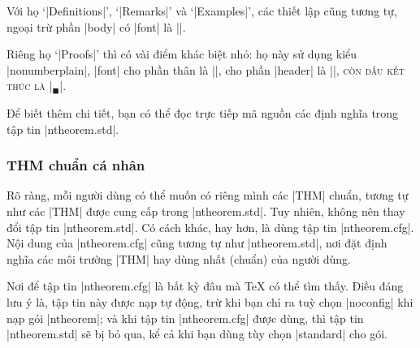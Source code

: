 Với họ `|Definitions|', `|Remarks|' và `|Examples|', các thiết lập cũng
tương tự, ngoại trừ phần |body| có |font|  là |\upshape|.

\medskip
Riêng họ `|Proofs|' thì có vài điểm khác biệt nhỏ: họ này sử dụng
kiểu |nonumberplain|, |font| cho phần thân là |\upshape|,
cho phần |header| là |\scshape|, còn dấu kết thúc là |\ensuremath{_\blacksquare}|.

\medskip
Để biết thêm chi tiết, bạn có thể đọc trực tiếp mã nguồn
các định nghĩa trong tập tin |ntheorem.std|.

\subsubsection{\texorpdfstring{THM chuẩn cá nhân}{THM chuan ca nhan}}
\label{sec:private.thm}

Rõ ràng, mỗi người dùng có thể muốn có riêng mình các |THM|
chuẩn, tương tự như các |THM| được cung cấp trong |ntheorem.std|.
Tuy nhiên, không nên thay đổi tập tin |ntheorem.std|.
Có cách khác, hay hơn, là dùng tập tin |ntheorem.cfg|.
Nội dung của |ntheorem.cfg| cũng tương tự như |ntheorem.std|,
nơi đặt định nghĩa các môi trường |THM| hay dùng nhất (chuẩn)
của người dùng.

\medskip
Nơi để tập tin |ntheorem.cfg| là bất kỳ đâu mà \TeX{} có thể tìm
thấy. Điều đáng lưu ý là, tập tin này được nạp tự động,
trừ khi bạn chỉ ra tuỳ chọn |noconfig| khi nạp gói |ntheorem|;
và khi tập tin |ntheorem.cfg| được dùng, thì tập tin |ntheorem.std|
sẽ bị bỏ qua, kể cả khi bạn dùng tùy chọn |standard| cho gói.

